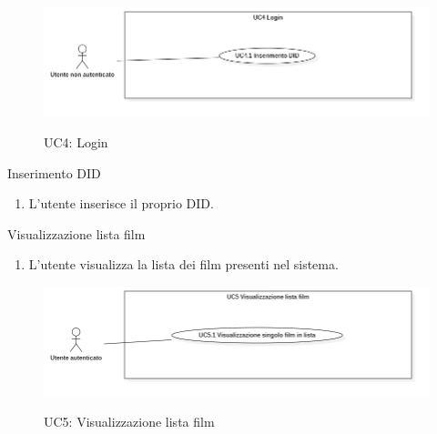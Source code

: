 \begin{figure}[!h] 
  \centering 
  \includegraphics[width=0.9\columnwidth, alt={Caso d'uso relativo all'autenticazione dell'utente}]{immagini/usecase/UC4.jpg}
  \caption{UC4: Login}\label{fig:uc:autenticazione}
\end{figure}

\begin{usecase}{4.1}{Inserimento DID}\label{uc:autenticazione-did}
  \usecasemain{}
  
  \begin{enumerate}
    \item L'utente inserisce il proprio DID.
  \end{enumerate}

\end{usecase}

\begin{usecase}{5}{Visualizzazione lista film}\label{uc:visualizzazione-lista-film}
  \usecasemain{}
  
  \begin{enumerate}
    \item L'utente visualizza la lista dei film presenti nel sistema.
  \end{enumerate}
\end{usecase}

\begin{figure}[!h] 
  \centering 
  \includegraphics[width=0.9\columnwidth, alt={Caso d'uso relativo alla visualizzazione della lista dei film dell'utente}]{immagini/usecase/UC5.jpg}
  \caption{UC5: Visualizzazione lista film}\label{fig:uc:visualizzazione-lista-film}
\end{figure}

